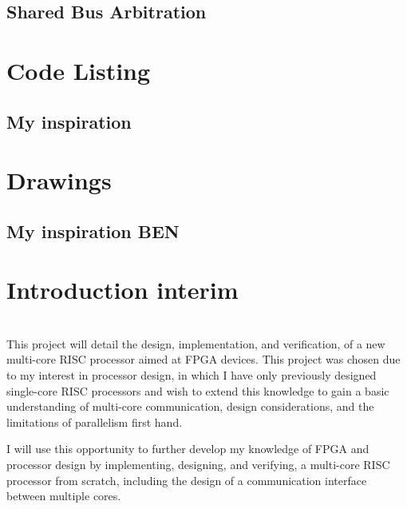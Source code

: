 \documentclass[11pt,a4paper]{report}
\begin{document}
{\section{Shared Bus Arbitration}

\newpage
\begin{appendices}

\chapter{Code Listing}
\section{My inspiration}
\chapter{Drawings}
\section{My inspiration BEN}
\end{appendices}

\newpage
\chapter{Introduction interim}
{%
\startcontents[chapters]
}

\noindent\\
This project will detail the design, implementation, and verification, of a new multi-core RISC processor aimed at FPGA devices. This project was chosen due to my interest in processor design, in which I have only previously designed single-core RISC processors and wish to extend this knowledge to gain a basic understanding of multi-core communication, design considerations, and the limitations of parallelism first hand.

I will use this opportunity to further develop my knowledge of FPGA and processor design by implementing, designing, and verifying, a multi-core RISC processor from scratch, including the design of a communication interface between multiple cores.

}
\end{document}
